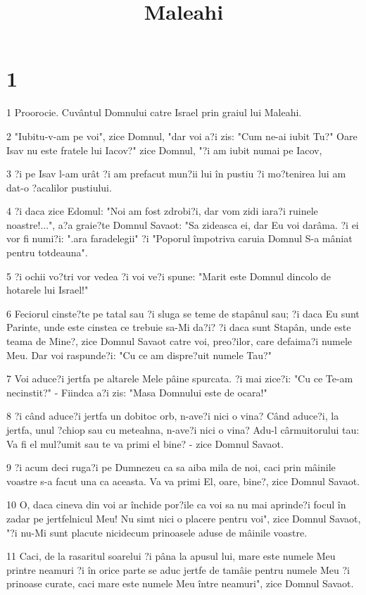

\title{Maleahi}


\chapter{1}

\par 1 Proorocie. Cuvântul Domnului catre Israel prin graiul lui Maleahi.
\par 2 "Iubitu-v-am pe voi", zice Domnul, "dar voi a?i zis: "Cum ne-ai iubit Tu?" Oare Isav nu este fratele lui Iacov?" zice Domnul, "?i am iubit numai pe Iacov,
\par 3 ?i pe Isav l-am urât ?i am prefacut mun?ii lui în pustiu ?i mo?tenirea lui am dat-o ?acalilor pustiului.
\par 4 ?i daca zice Edomul: "Noi am fost zdrobi?i, dar vom zidi iara?i ruinele noastre!...", a?a graie?te Domnul Savaot: "Sa zideasca ei, dar Eu voi darâma. ?i ei vor fi numi?i: ".ara faradelegii" ?i "Poporul împotriva caruia Domnul S-a mâniat pentru totdeauna".
\par 5 ?i ochii vo?tri vor vedea ?i voi ve?i spune: "Marit este Domnul dincolo de hotarele lui Israel!"
\par 6 Feciorul cinste?te pe tatal sau ?i sluga se teme de stapânul sau; ?i daca Eu sunt Parinte, unde este cinstea ce trebuie sa-Mi da?i? ?i daca sunt Stapân, unde este teama de Mine?, zice Domnul Savaot catre voi, preo?ilor, care defaima?i numele Meu. Dar voi raspunde?i: "Cu ce am dispre?uit numele Tau?"
\par 7 Voi aduce?i jertfa pe altarele Mele pâine spurcata. ?i mai zice?i: "Cu ce Te-am necinstit?" - Fiindca a?i zis: "Masa Domnului este de ocara!"
\par 8 ?i când aduce?i jertfa un dobitoc orb, n-ave?i nici o vina? Când aduce?i, la jertfa, unul ?chiop sau cu meteahna, n-ave?i nici o vina? Adu-l cârmuitorului tau: Va fi el mul?umit sau te va primi el bine? - zice Domnul Savaot.
\par 9 ?i acum deci ruga?i pe Dumnezeu ca sa aiba mila de noi, caci prin mâinile voastre s-a facut una ca aceasta. Va va primi El, oare, bine?, zice Domnul Savaot.
\par 10 O, daca cineva din voi ar închide por?ile ca voi sa nu mai aprinde?i focul în zadar pe jertfelnicul Meu! Nu simt nici o placere pentru voi", zice Domnul Savaot, "?i nu-Mi sunt placute nicidecum prinoasele aduse de mâinile voastre.
\par 11 Caci, de la rasaritul soarelui ?i pâna la apusul lui, mare este numele Meu printre neamuri ?i în orice parte se aduc jertfe de tamâie pentru numele Meu ?i prinoase curate, caci mare este numele Meu între neamuri", zice Domnul Savaot.
